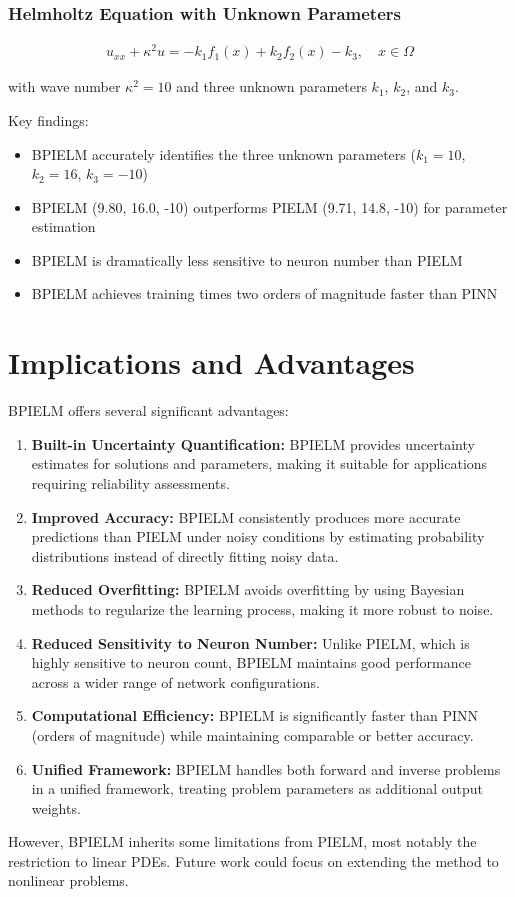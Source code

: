 \documentclass[11pt]{article}
\begin{document}
\subsubsection{Helmholtz Equation with Unknown Parameters}

\begin{align}
    u_{xx} + \kappa^2 u = -k_1 f_1(x) + k_2 f_2(x) - k_3, \quad x \in \Omega
\end{align}

with wave number $\kappa^2 = 10$ and three unknown parameters $k_1$, $k_2$, and $k_3$.

Key findings:
\begin{itemize}
    \item BPIELM accurately identifies the three unknown parameters ($k_1 = 10$, $k_2 = 16$, $k_3 = -10$)
    \item BPIELM (9.80, 16.0, -10) outperforms PIELM (9.71, 14.8, -10) for parameter estimation
    \item BPIELM is dramatically less sensitive to neuron number than PIELM
    \item BPIELM achieves training times two orders of magnitude faster than PINN
\end{itemize}

\section{Implications and Advantages}

BPIELM offers several significant advantages:

\begin{enumerate}
    \item \textbf{Built-in Uncertainty Quantification:} BPIELM provides uncertainty estimates for solutions and parameters, making it suitable for applications requiring reliability assessments.
    
    \item \textbf{Improved Accuracy:} BPIELM consistently produces more accurate predictions than PIELM under noisy conditions by estimating probability distributions instead of directly fitting noisy data.
    
    \item \textbf{Reduced Overfitting:} BPIELM avoids overfitting by using Bayesian methods to regularize the learning process, making it more robust to noise.
    
    \item \textbf{Reduced Sensitivity to Neuron Number:} Unlike PIELM, which is highly sensitive to neuron count, BPIELM maintains good performance across a wider range of network configurations.
    
    \item \textbf{Computational Efficiency:} BPIELM is significantly faster than PINN (orders of magnitude) while maintaining comparable or better accuracy.
    
    \item \textbf{Unified Framework:} BPIELM handles both forward and inverse problems in a unified framework, treating problem parameters as additional output weights.
\end{enumerate}

However, BPIELM inherits some limitations from PIELM, most notably the restriction to linear PDEs. Future work could focus on extending the method to nonlinear problems.
\end{document}
